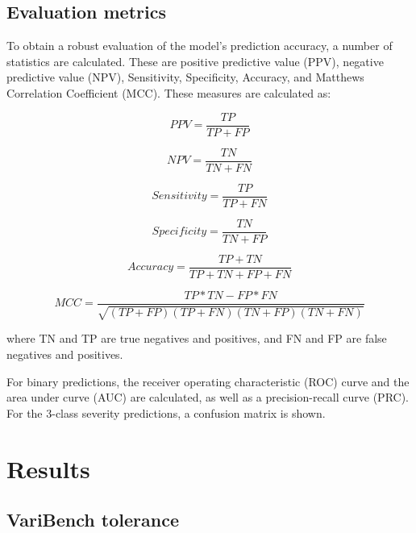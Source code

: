 \documentclass[11pt]{article}
\begin{document}
\subsection{Evaluation metrics}

To obtain a robust evaluation of the model's prediction accuracy, a number of statistics are calculated. These are positive predictive value (PPV), negative predictive value (NPV), Sensitivity, Specificity, Accuracy, and Matthews Correlation Coefficient (MCC). These measures are calculated as:

\begin{equation} \label{eq:ppv}
PPV = \frac{TP}{{TP+FP}}
\end{equation}

\begin{equation} \label{eq:npv}
NPV = \frac{TN}{{TN+FN}}
\end{equation}

\begin{equation} \label{eq:sens}
Sensitivity = \frac{TP}{{TP+FN}}
\end{equation}

\begin{equation} \label{eq:spec}
Specificity = \frac{TN}{{TN+FP}}
\end{equation}

\begin{equation} \label{eq:acc}
Accuracy = \frac{TP+TN}{{TP+TN+FP+FN}}
\end{equation}

\begin{equation} \label{eq:mcc}
MCC = \frac{TP*TN - FP*FN}{{\sqrt{(TP+FP)(TP+FN)(TN+FP)(TN+FN)}}}
\end{equation}

where TN and TP are true negatives and positives, and FN and FP are false negatives and positives.

For binary predictions, the receiver operating characteristic (ROC) curve and the area under curve (AUC) are calculated, as well as a precision-recall curve (PRC). For the 3-class severity predictions, a confusion matrix is shown.


\section{Results}
    
\subsection{VariBench tolerance}
\end{document}
